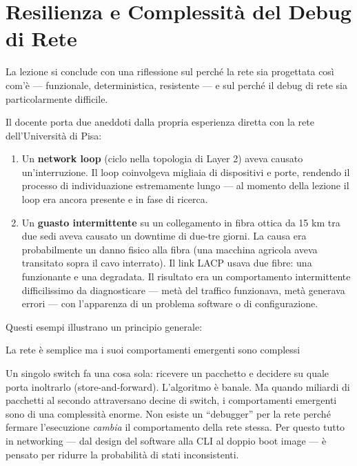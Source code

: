 \documentclass[
  italian,
  openany]{book}
\begin{document}
\section{Resilienza e Complessità del Debug di
Rete}\label{resilienza-e-complessituxe0-del-debug-di-rete}

La lezione si conclude con una riflessione sul perché la rete sia
progettata così com'è --- funzionale, deterministica, resistente --- e
sul perché il debug di rete sia particolarmente difficile.

Il docente porta due aneddoti dalla propria esperienza diretta con la
rete dell'Università di Pisa:

\begin{enumerate}
\def\labelenumi{\arabic{enumi}.}
\item
  Un \textbf{network loop} (ciclo nella topologia di Layer 2) aveva
  causato un'interruzione. Il loop coinvolgeva migliaia di dispositivi e
  porte, rendendo il processo di individuazione estremamente lungo ---
  al momento della lezione il loop era ancora presente e in fase di
  ricerca.
\item
  Un \textbf{guasto intermittente} su un collegamento in fibra ottica da
  15 km tra due sedi aveva causato un downtime di due-tre giorni. La
  causa era probabilmente un danno fisico alla fibra (una macchina
  agricola aveva transitato sopra il cavo interrato). Il link LACP usava
  due fibre: una funzionante e una degradata. Il risultato era un
  comportamento intermittente difficilissimo da diagnosticare --- metà
  del traffico funzionava, metà generava errori --- con l'apparenza di
  un problema software o di configurazione.
\end{enumerate}

Questi esempi illustrano un principio generale:

\begin{callouttip}{La rete è semplice ma i suoi comportamenti emergenti sono complessi}

Un singolo switch fa una cosa sola: ricevere un pacchetto e decidere su
quale porta inoltrarlo (store-and-forward). L'algoritmo è banale. Ma
quando miliardi di pacchetti al secondo attraversano decine di switch, i
comportamenti emergenti sono di una complessità enorme. Non esiste un
``debugger'' per la rete perché fermare l'esecuzione \emph{cambia} il
comportamento della rete stessa. Per questo tutto in networking --- dal
design del software alla CLI al doppio boot image --- è pensato per
ridurre la probabilità di stati inconsistenti.

\end{callouttip}
\end{document}

